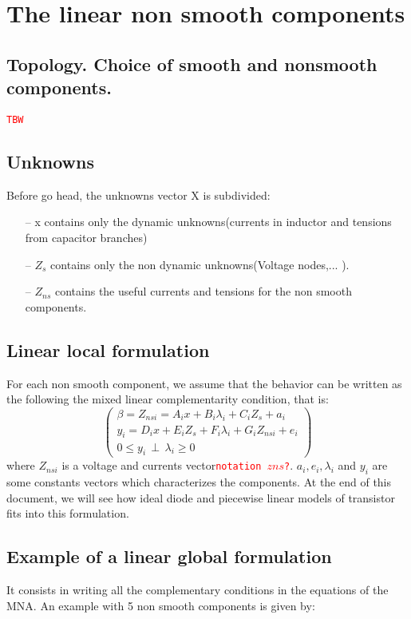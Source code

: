 


\section{The linear non smooth components}
\subsection{Topology. Choice of smooth and nonsmooth components.}
\textcolor{red}{\tt TBW}
\subsection{Unknowns}
Before go head, the unknowns vector X is subdivided:
\begin{enumerate}
\item[--] x contains only the dynamic unknowns(currents in inductor and tensions from capacitor branches)
\item[--] $Z_{s}$ contains only the non dynamic unknowns(Voltage nodes,... ).
\item[--] $Z_{ns}$ contains the useful currents and tensions for the non smooth components.
\end{enumerate}
\subsection{Linear local formulation}
For each non smooth component, we assume that the behavior can be written as the following the mixed linear  complementarity condition, that is:
\begin{equation}\left(\begin{array}{c}
\beta = Z_{nsi} = A_{i}x+B_{i}\lambda_{i}+C_{i}Z_{s} + a_{i}\\
y_{i}=D_{i}x+E_{i}Z_{s}+F_{i}\lambda_{i}+G_{i}Z_{nsi}+e_{i}\\
0 \leq y_{i} \, \perp \, \lambda_{i} \geq 0
\end{array}\right)
\end{equation}
where $Z_{nsi}$ is a voltage and currents vector\textcolor{red}{\tt notation $zns$?}. $a_{i},e_{i},\lambda_{i}$ and $y_{i}$ are some constants vectors which characterizes the components. At the end
of this document, we will see how ideal diode and piecewise linear models of transistor fits into this formulation.


\subsection{Example of a linear global formulation}
It consists in writing all the complementary conditions in the equations of the MNA. An example with 5 non smooth components is given by:

